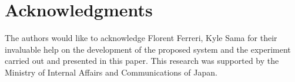 \documentclass[a4paper, 10pt, conference]{ieeeconf}     %
\begin{document}
\section{Acknowledgments}
The authors would like to acknowledge Florent Ferreri, Kyle Sama for their invaluable help on the development of the proposed system and the experiment carried out and presented in this paper. 
This research was supported by the Ministry of Internal Affairs and Communications of Japan.




\end{document}
